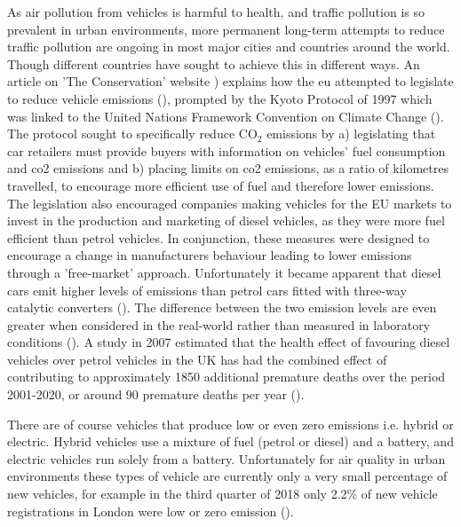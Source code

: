 As air pollution from vehicles is harmful to health, and traffic pollution is so prevalent in urban environments, more permanent long-term attempts to reduce traffic pollution are ongoing in most major cities and countries around the world. Though different countries have sought to achieve this in different ways. An article on 'The Conservation' website \cite{Williams2013}) explains how the \gls{eu} attempted to legislate to reduce vehicle emissions (\cite{Williams2013}), prompted by the Kyoto Protocol of 1997 which was linked to the United Nations Framework Convention on Climate Change (\cite{UnitedNations1998}). The protocol sought to specifically reduce CO$_{2}$ emissions by a) legislating that car retailers must provide buyers with information on vehicles' fuel consumption and \gls{co2} emissions and b) placing limits on \gls{co2} emissions, as a ratio of kilometres travelled, to encourage more efficient use of fuel and therefore lower emissions. The legislation also encouraged companies making vehicles for the EU markets to invest in the production and marketing of diesel vehicles, as they were more fuel efficient than petrol vehicles. In conjunction, these measures were designed to encourage a change in manufacturers behaviour leading to lower emissions through a 'free-market' approach. Unfortunately it became apparent that diesel cars emit higher levels of emissions than petrol cars fitted with three-way catalytic converters (\cite{Williams2013}). The difference between the two emission levels are even greater when considered in the real-world rather than measured in laboratory conditions (\cite{Carslaw2011}). A study in 2007 estimated that the health effect of favouring diesel vehicles over petrol vehicles in the UK has had the combined effect of contributing to approximately 1850 additional premature deaths over the period 2001-2020, or around 90 premature deaths per year (\cite{Mazzi2007}).

There are of course vehicles that produce low or even zero emissions i.e. hybrid or electric. Hybrid vehicles use a mixture of fuel (petrol or diesel) and a battery, and electric vehicles run solely from a battery.  Unfortunately for air quality in urban environments these types of vehicle are currently only a very small percentage of new vehicles, for example in the third quarter of 2018 only 2.2\% of new vehicle registrations in London were low or zero emission (\cite{TFL2018}).

